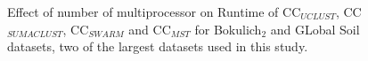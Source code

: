 \documentclass[10pt, conference, compsocconf]{IEEEtran}
\begin{document}
\begin{figure}[t]	
	\begin{minipage}[t]{0.5\linewidth}
	\end{minipage}%
	\hfill%
	\begin{minipage}[t]{0.5\linewidth}
	\end{minipage}	
	\caption{Effect of number of multiprocessor on Runtime of CC$_{UCLUST}$, CC$_{SUMACLUST}$, CC$_{SWARM}$ and CC$_{MST}$ for Bokulich$_2$ and GLobal Soil datasets, two of the largest datasets used in this study.}
\end{figure}
\end{document}
